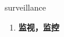 
\begin{frame}
{\huge surveillance}
\begin{center}
\begin{enumerate}\Large
  \item \textbf{监视，监控}
\end{enumerate}
\end{center}
\end{frame}
